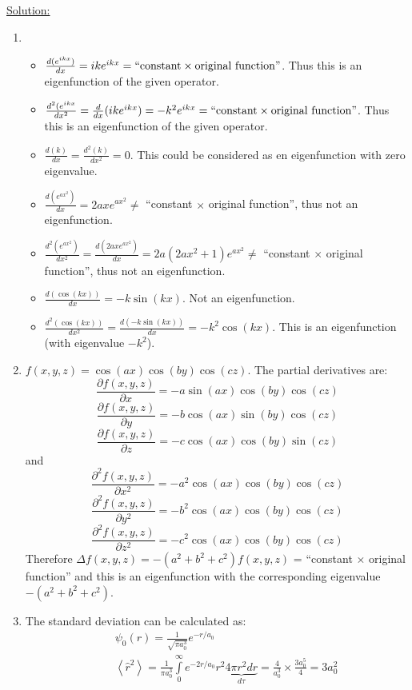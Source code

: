 \noindent
\underline{Solution:}\\
\begin{enumerate}
\item
\begin{itemize}
\item $\frac{d(e^{ikx})}{dx} = ike^{ikx} = \textnormal{``constant} \times \textnormal{original function''}$. Thus this is an eigenfunction of the given operator.
\item $\frac{d^2(e^{ikx}}{dx^2} = \frac{d}{dx}(ike^{ikx}) = -k^2e^{ikx} = \textnormal{``constant} \times \textnormal{original function''}$. Thus this is an eigenfunction of the given operator.
\item $\frac{d(k)}{dx} = \frac{d^2(k)}{dx^2} = 0$. This could be considered as en eigenfunction with zero eigenvalue.
\item $\frac{d(e^{ax^2})}{dx} = 2axe^{ax^2} \ne$ ``constant $\times$ original function'', thus not an eigenfunction.
\item $\frac{d^2(e^{ax^2})}{dx^2} = \frac{d(2axe^{ax^2})}{dx} = 2a(2ax^2 + 1)e^{ax^2} \ne$ ``constant $\times$ original function'', thus not an eigenfunction.
\item $\frac{d(\cos(kx))}{dx} = -k\sin(kx)$. Not an eigenfunction.
\item $\frac{d^2(\cos(kx))}{dx^2} = \frac{d(-k\sin(kx))}{dx} = -k^2\cos(kx)$. This is an eigenfunction (with eigenvalue $-k^2$).
\end{itemize}
\item $f(x, y, z) = \cos(ax)\cos(by)\cos(cz)$. The partial derivatives are:
$$\frac{\partial f(x,y,z)}{\partial x} = -a\sin(ax)\cos(by)\cos(cz)$$
$$\frac{\partial f(x,y,z)}{\partial y} = -b\cos(ax)\sin(by)\cos(cz)$$
$$\frac{\partial f(x,y,z)}{\partial z} = -c\cos(ax)\cos(by)\sin(cz)$$
and
$$\frac{\partial^2 f(x,y,z)}{\partial x^2} = -a^2\cos(ax)\cos(by)\cos(cz)$$
$$\frac{\partial^2 f(x,y,z)}{\partial y^2} = -b^2\cos(ax)\cos(by)\cos(cz)$$
$$\frac{\partial^2 f(x,y,z)}{\partial z^2} = -c^2\cos(ax)\cos(by)\cos(cz)$$
Therefore $\Delta f(x,y,z) = -(a^2 + b^2 + c^2)f(x,y,z)$ = ``constant $\times$ original function'' and this is an eigenfunction with
the corresponding eigenvalue $-(a^2 + b^2 + c^2)$.
\item The standard deviation can be calculated as:
\begin{eqnarray}
\nonumber
& & \psi_0(r) = \frac{1}{\sqrt{\pi a_0^3}} e^{-r/a_0}\\
\nonumber
& & \left<\hat{r}^2\right> = \frac{1}{\pi a_0^3}\int\limits_{0}^{\infty}e^{-2r/a_0}r^2\underbrace{4\pi r^2 dr}_{d\tau} = \frac{4}{a_0^3}\times\frac{3a_0^5}{4} = 3a_0^2\\

\end{eqnarray}
\end{enumerate}
